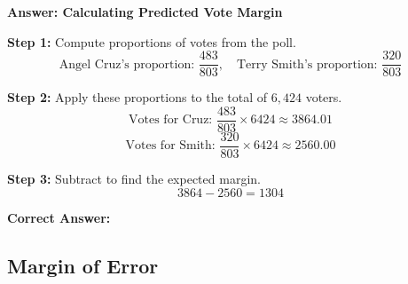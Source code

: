\documentclass{beamer}
\begin{document}
\begin{frame}{\textbf{Answer: Calculating Predicted Vote Margin}}

\textbf{Step 1:} Compute proportions of votes from the poll.
\[
\text{Angel Cruz's proportion: } \frac{483}{803}, \quad
\text{Terry Smith's proportion: } \frac{320}{803}
\]

\textbf{Step 2:} Apply these proportions to the total of \( 6{,}424 \) voters.
\[
\text{Votes for Cruz: } \frac{483}{803} \times 6424 \approx 3864.01
\]
\[
\text{Votes for Smith: } \frac{320}{803} \times 6424 \approx 2560.00
\]

\textbf{Step 3:} Subtract to find the expected margin.
\[
3864 - 2560 = \boxed{1304}
\]

\textbf{Correct Answer:} 
\end{frame}

\begin{frame}

\section{Margin of Error}
\end{frame}
\end{document}
